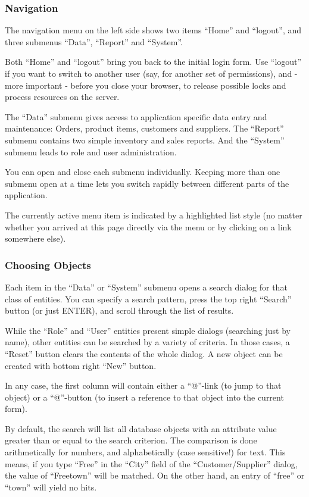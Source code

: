\subsubsection{ Navigation}
\label{sec:appl-devel-navigation}%
The navigation menu on the left side shows two items ``Home'' and
``logout'', and three submenus ``Data'', ``Report'' and ``System''.

Both ``Home'' and ``logout'' bring you back to the initial login form. Use
``logout'' if you want to switch to another user (say, for another set of
permissions), and - more important - before you close your browser, to
release possible locks and process resources on the server.

The ``Data'' submenu gives access to application specific data entry and
maintenance: Orders, product items, customers and suppliers. The
``Report'' submenu contains two simple inventory and sales reports. And
the ``System'' submenu leads to role and user administration.

You can open and close each submenu individually. Keeping more than one
submenu open at a time lets you switch rapidly between different parts
of the application.

The currently active menu item is indicated by a highlighted list style
(no matter whether you arrived at this page directly via the menu or by
clicking on a link somewhere else).

 
\subsubsection{ Choosing Objects}
\label{sec:appl-devel-choosing-objects}%

Each item in the ``Data'' or ``System'' submenu opens a search dialog for
that class of entities. You can specify a search pattern, press the top
right ``Search'' button (or just ENTER), and scroll through the list of
results.

While the ``Role'' and ``User'' entities present simple dialogs (searching
just by name), other entities can be searched by a variety of criteria.
In those cases, a ``Reset'' button clears the contents of the whole
dialog. A new object can be created with bottom right ``New'' button.

In any case, the first column will contain either a ``@''-link (to jump to
that object) or a ``@''-button (to insert a reference to that object into
the current form).

By default, the search will list all database objects with an attribute
value greater than or equal to the search criterion. The comparison is
done arithmetically for numbers, and alphabetically (case sensitive!)
for text. This means, if you type ``Free'' in the ``City'' field of the
``Customer/Supplier'' dialog, the value of ``Freetown'' will be matched. On
the other hand, an entry of ``free'' or ``town'' will yield no hits.

